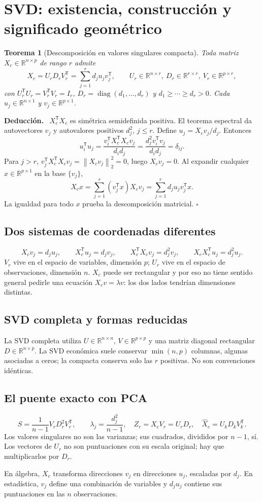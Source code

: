 \documentclass[11pt,a4paper]{article}
\newcommand{\R}{\mathbb R}
\newcommand{\T}{^{\mathsf T}}
\newcommand{\norm}[1]{\left\lVert #1\right\rVert}
\newenvironment{deduccion}{\par\textbf{Deducción.}\ }{\hfill$\square$\par}
\DeclareMathOperator{\diag}{diag}
\newtheorem{teorema}{Teorema}[section]
\theoremstyle{definition}
\begin{document}
\section{SVD: existencia, construcción y significado geométrico}
\begin{teorema}[Descomposición en valores singulares compacta]
Toda matriz $X_c\in\R^{n\times p}$ de rango $r$ admite
\[
\boxed{X_c=U_rD_rV_r\T=\sum_{j=1}^rd_j u_jv_j\T},\qquad
U_r\in\R^{n\times r},\ D_r\in\R^{r\times r},\ V_r\in\R^{p\times r},
\]
con $U_r\T U_r=V_r\T V_r=I_r$, $D_r=\diag(d_1,\ldots,d_r)$ y $d_1\ge\cdots\ge d_r>0$. Cada $u_j\in\R^{n\times1}$ y $v_j\in\R^{p\times1}$.
\end{teorema}
\begin{deduccion}
$X_c\T X_c$ es simétrica semidefinida positiva. El teorema espectral da autovectores $v_j$ y autovalores positivos $d_j^2$, $j\le r$. Define $u_j=X_cv_j/d_j$. Entonces
\[
u_i\T u_j=\frac{v_i\T X_c\T X_cv_j}{d_id_j}
=\frac{d_j^2v_i\T v_j}{d_id_j}=\delta_{ij}.
\]
Para $j>r$, $v_j\T X_c\T X_cv_j=\norm{X_cv_j}_2^2=0$, luego $X_cv_j=0$. Al expandir cualquier $x\in\R^{p\times1}$ en la base $\{v_j\}$,
\[
X_cx=\sum_{j=1}^r(v_j\T x)X_cv_j
=\sum_{j=1}^rd_j u_jv_j\T x.
\]
La igualdad para todo $x$ prueba la descomposición matricial.
\end{deduccion}
\subsection{Dos sistemas de coordenadas diferentes}
\[
X_cv_j=d_ju_j,\qquad X_c\T u_j=d_jv_j,\qquad
X_c\T X_cv_j=d_j^2v_j,\qquad X_cX_c\T u_j=d_j^2u_j.
\]
$V_r$ vive en el espacio de variables, dimensión $p$; $U_r$ vive en el espacio de observaciones, dimensión $n$. $X_c$ puede ser rectangular y por eso no tiene sentido general pedirle una ecuación $X_cv=\lambda v$: los dos lados tendrían dimensiones distintas.
\subsection{SVD completa y formas reducidas}
La SVD completa utiliza $U\in\R^{n\times n}$, $V\in\R^{p\times p}$ y una matriz diagonal rectangular $D\in\R^{n\times p}$. La SVD económica suele conservar $\min(n,p)$ columnas, algunas asociadas a ceros; la compacta conserva solo las $r$ positivas. No son convenciones idénticas.
\subsection{El puente exacto con PCA}
\[
S=\frac1{n-1}V_rD_r^2V_r\T,\qquad
\boxed{\lambda_j=\frac{d_j^2}{n-1}},\quad
\boxed{Z_r=X_cV_r=U_rD_r},\quad
\boxed{\widehat X_c=U_kD_kV_k\T}.
\]
Los valores singulares no son las varianzas; sus cuadrados, divididos por $n-1$, sí. Los vectores de $U_r$ no son puntuaciones con su escala original; hay que multiplicarlos por $D_r$.
\begin{idea}
En álgebra, $X_c$ transforma direcciones $v_j$ en direcciones $u_j$, escaladas por $d_j$. En estadística, $v_j$ define una combinación de variables y $d_ju_j$ contiene sus puntuaciones en las $n$ observaciones.
\end{idea}
\end{document}
